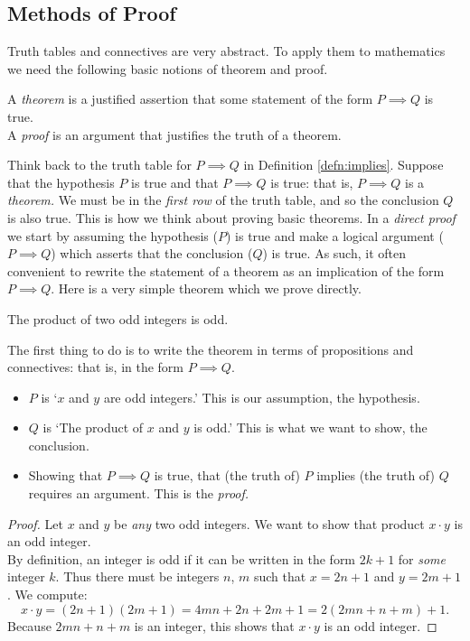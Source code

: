 \subsection{Methods of Proof}\label{sec:proof}


Truth tables and connectives are very abstract. To apply them to mathematics we need the following basic notions of theorem and proof.

\begin{defn}{}{}
A \emph{theorem} is a justified assertion that some statement of the form $P\implies Q$ is true.\\
A \emph{proof} is an argument that justifies the truth of a theorem.
\end{defn}

 Think back to the truth table for $P\implies Q$ in Definition \ref{defn:implies}. Suppose that the hypothesis $P$ is true and that $P\implies Q$ is true: that is, $P\implies Q$ is a \emph{theorem.} We must be in the \emph{first row} of the truth table, and so the conclusion $Q$ is also true. This is how we think about proving basic theorems. In a \emph{direct proof} we start by assuming the hypothesis ($P$) is true and make a logical argument ($P\implies Q$) which asserts that the conclusion ($Q$) is true. As such, it often convenient to rewrite the statement of a theorem as an implication of the form $P\implies Q$. Here is a very simple theorem which we prove directly. 

\begin{thm}{}{}
The product of two odd integers is odd.
\end{thm}

 The first thing to do is to write the theorem in terms of propositions and connectives: that is, in the form $P\implies Q$.
\begin{itemize}
  \item $P$ is `$x$ and $y$ are odd integers.' This is our assumption, the hypothesis.
  \item $Q$ is `The product of $x$ and $y$ is odd.' This is what we want to show, the conclusion.
  \item Showing that $P\implies Q$ is true, that (the truth of) $P$ implies (the truth of) $Q$ requires an argument. This is the \emph{proof.}
\end{itemize}

\begin{proof}
Let $x$ and $y$ be \emph{any} two odd integers. We want to show that product $x\cdot y$ is an odd integer. \\
By definition, an integer is odd if it can be written in the form $2k+1$ for \emph{some} integer $k$. Thus there must be integers $n$, $m$ such that $x=2n+1$ and $y=2m+1$. We compute:
\[x\cdot y=(2n+1)(2m+1)=4mn+2n+2m+1=2(2mn+n+m)+1.\]
Because $2mn+n+m$ is an integer, this shows that $x\cdot y$ is an odd integer.
\end{proof}

